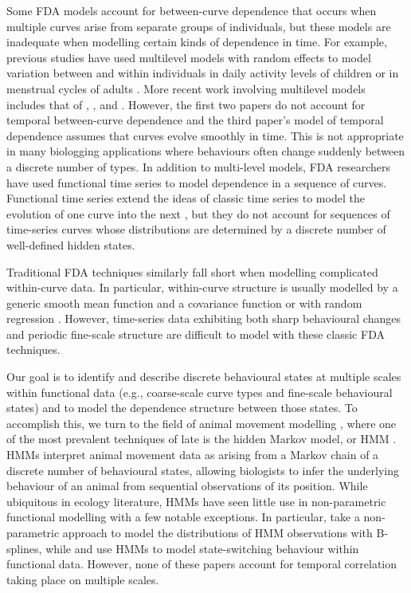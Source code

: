 Some FDA models account for between-curve dependence that occurs when multiple curves arise from separate groups of individuals, but these models are inadequate when modelling certain kinds of dependence in time. For example, previous studies have used multilevel models with random effects to model variation between and within individuals in daily activity levels of children \citep{Morris:2007} or in menstrual cycles of adults \citep{Bromback:1998}. More recent work involving multilevel models includes that of \citet{Di:2009}, \citet{Crainiceanu:2009}, and \citet{Chen:2012}. 
However, the first two papers do not account for temporal between-curve dependence and the third paper's model of temporal dependence assumes that curves evolve smoothly in time. This is not appropriate in many biologging applications where behaviours often change suddenly between a discrete number of types.
In addition to multi-level models, FDA researchers have used functional time series to model dependence in a sequence of curves. Functional time series extend the ideas of classic time series to model the evolution of one curve into the next \citep{Kokoszka:2018}, but they do not account for sequences of time-series curves whose distributions are determined by a discrete number of well-defined hidden states.

Traditional FDA techniques similarly fall short when modelling complicated within-curve data. In particular, within-curve structure is usually modelled by a generic smooth mean function and a covariance function \citep{Yao:2005} or with random regression \citep{Rice:2001}. However, time-series data exhibiting both sharp behavioural changes and periodic fine-scale structure are difficult to model with these classic FDA techniques.

Our goal is to identify and describe discrete behavioural states at multiple scales within functional data (e.g., coarse-scale curve types and fine-scale behavioural states) and to model the dependence structure between those states. To accomplish this, we turn to the field of animal movement modelling \citep{Hooten:2017}, where one of the most prevalent techniques of late is the hidden Markov model, or HMM \citep{Patterson:2017,McClintock:2020}. HMMs interpret animal movement data as arising from a Markov chain of a discrete number of behavioural states, allowing biologists to infer the underlying behaviour of an animal from sequential observations of its position. While ubiquitous in ecology literature, HMMs have seen little use in non-parametric functional modelling with a few notable exceptions. In particular, \citet{Langrock:2018} take a non-parametric approach to model the distributions of HMM observations with B-splines, while \citet{DeSouza:2014} and \citet{DeSouza:2017} use HMMs to model state-switching behaviour within functional data. However, none of these papers account for temporal correlation taking place on multiple scales. 

